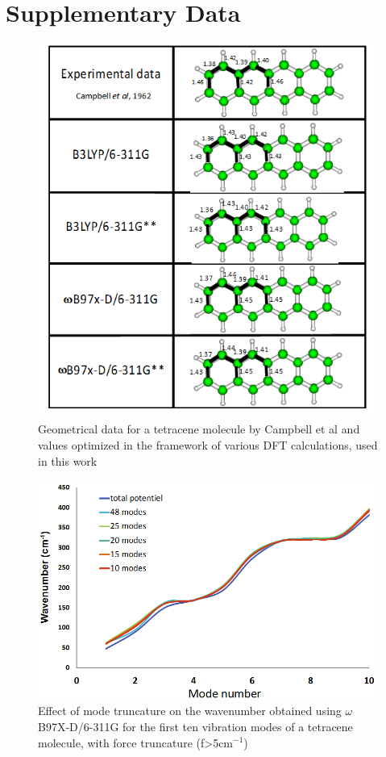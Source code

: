  \newpage
 
 \section*{Supplementary Data}
 
 \begin{figure}[h]
 	\centering
 	\includegraphics[scale=0.8]{image/geometrical-data}
 	\caption[Geometrical data for a tetracene molecule]{Geometrical data for a tetracene molecule by Campbell et al \cite{campbell1962crystal} and values optimized in the framework of various DFT calculations, used in this work}
 \end{figure}
 
 \begin{figure}[h]
 	\centering
 	\includegraphics[scale=0.8]{image/mode-trunc}
 	\caption[Effect of mode truncature on the first ten mode on wavenumber of tetracene ]{Effect of mode truncature on the wavenumber obtained using $\omega$B97X-D/6-311G for the first ten vibration modes of a tetracene molecule, with force truncature (f>5cm$^{-1}$)}
 \end{figure}
 
